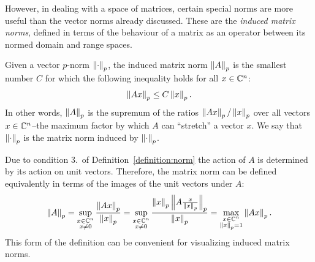 However, in dealing with a space of matrices, certain special norms are more useful than the vector norms already discussed. These are the {\em induced matrix norms}, defined in terms of the behaviour of a matrix as an operator between its normed domain and range spaces.

Given a vector $p$-norm $\left\|{\cdot}\right\|_p$, the induced matrix norm $\left\|{A}\right\|_p$ is the smallest number $C$ for which the following inequality holds for all $x\in\mathbb{C}^n$:
\begin{equation}
\left\|{Ax}\right\|_p \le C\left\|{x}\right\|_p.
\end{equation}
In other words, $\left\|{A}\right\|_p$ is the supremum of the ratios $\left\|{Ax}\right\|_p/\left\|{x}\right\|_p$ over all vectors $x\in\mathbb{C}^n$--the maximum factor by which $A$ can ``stretch'' a vector $x$. We say that $\left\|{\cdot}\right\|_p$ is the matrix norm induced by $\left\|{\cdot}\right\|_p$.

Due to condition 3.~of Definition~\ref{definition:norm} the action of $A$ is determined by its action on unit vectors. Therefore, the matrix norm can be defined equivalently in terms of the images of the unit vectors under $A$:
\begin{equation}
\left\|{A}\right\|_p = \sup_{\substack{x\in\mathbb{C}^n\\x\ne0}}\dfrac{\left\|{Ax}\right\|_p}{\left\|{x}\right\|_p} = \sup_{\substack{x\in\mathbb{C}^n\\x\ne0}}\dfrac{\left\|{x}\right\|_p\left\|{A\frac{x}{\left\|{x}\right\|_p}}\right\|_p}{\left\|{x}\right\|_p} = \max_{\substack{x\in\mathbb{C}^n\\ \left\|{x}\right\|_p = 1}}\left\|{Ax}\right\|_p.
\end{equation}
This form of the definition can be convenient for visualizing induced matrix norms.

